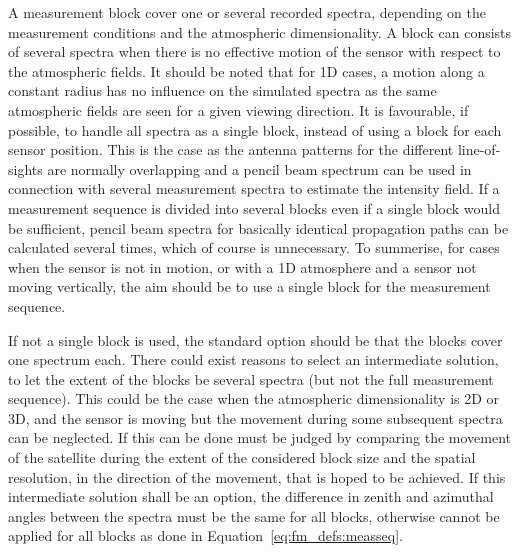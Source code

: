 A measurement block cover one or several recorded spectra, depending
on the measurement conditions and the atmospheric dimensionality. A
block can consists of several spectra when there is no effective
motion of the sensor with respect to the atmospheric fields. It should
be noted that for 1D cases, a motion along a constant radius has no
influence on the simulated spectra as the same atmospheric fields are
seen for a given viewing direction. It is favourable, if possible, to
handle all spectra as a single block, instead of using a block for
each sensor position. This is the case as the antenna patterns for the
different line-of-sights are normally overlapping and a pencil beam
spectrum can be used in connection with several measurement spectra to
estimate the intensity field. If a measurement sequence is divided
into several blocks even if a single block would be sufficient, pencil
beam spectra for basically identical propagation paths can be
calculated several times, which of course is unnecessary. To
summerise, for cases when the sensor is not in motion, or with a 1D
atmosphere and a sensor not moving vertically, the aim should be to
use a single block for the measurement sequence.

If not a single block is used, the standard option should be that the
blocks cover one spectrum each. There could exist reasons to select an
intermediate solution, to let the extent of the blocks be several
spectra (but not the full measurement sequence). This could be the
case when the atmospheric dimensionality is 2D or 3D, and the sensor
is moving but the movement during some subsequent spectra can be
neglected. If this can be done must be judged by comparing the
movement of the satellite during the extent of the considered block
size and the spatial resolution, in the direction of the movement, that
is hoped to be achieved. If this intermediate solution shall be an
option, the difference in zenith and azimuthal angles between the
spectra must be the same for all blocks, otherwise  cannot
be applied for all blocks as done in Equation~\ref{eq:fm_defs:measseq}.

